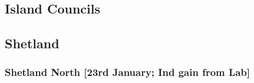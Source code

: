 \documentclass[a4paper,openany]{book}
\begin{document}
\begin{resultsiii}
%
%
%
%
%
%
%

\section{Island Councils}

\subsection*{Shetland}

\subsubsection*{Shetland North \hspace*{\fill}\nolinebreak[1]%
	\enspace\hspace*{\fill}
	[23rd January; Ind gain from Lab]}


\end{resultsiii}
\end{document}

